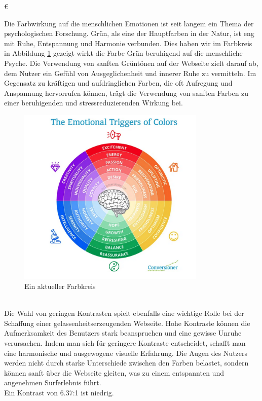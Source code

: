 €\documentclass[./dokumentation.tex]{subfiles}
\begin{document}
Die Farbwirkung auf die menschlichen Emotionen ist seit langem ein Thema der psychologischen Forschung. Grün, als eine der Hauptfarben in der Natur, ist eng mit Ruhe, Entspannung und Harmonie verbunden. Dies haben wir im Farbkreis in Abbildung \ref{fig20:farbkreis} gezeigt wirkt die Farbe Grün beruhigend auf die menschliche Psyche. Die Verwendung von sanften Grüntönen auf der Webseite zielt darauf ab, dem Nutzer ein Gefühl von Ausgeglichenheit und innerer Ruhe zu vermitteln. Im Gegensatz zu kräftigen und aufdringlichen Farben, die oft Aufregung und Anspannung hervorrufen können, trägt die Verwendung von sanften Farben zu einer beruhigenden und stressreduzierenden Wirkung bei.\\

\begin{figure}[H]
\centering
\includegraphics[width=0.8\textwidth]{bilder/farbkreis.png}
\caption{Ein aktueller Farbkreis \cite{DesignEmo2003}}
\label{fig20:farbkreis}
\end{figure}\\

Die Wahl von geringen Kontrasten spielt ebenfalls eine wichtige Rolle bei der Schaffung einer gelassenheitserzeugenden Webseite. Hohe Kontraste können die Aufmerksamkeit des Benutzers stark beanspruchen und eine gewisse Unruhe verursachen. Indem man sich für geringere Kontraste entscheidet, schafft man eine harmonische und ausgewogene visuelle Erfahrung. Die Augen des Nutzers werden nicht durch starke Unterschiede zwischen den Farben belastet, sondern können sanft über die Webseite gleiten, was zu einem entspannten und angenehmen Surferlebnis führt.\\
Ein Kontrast von 6.37:1 ist niedrig. \\
\end{document}
